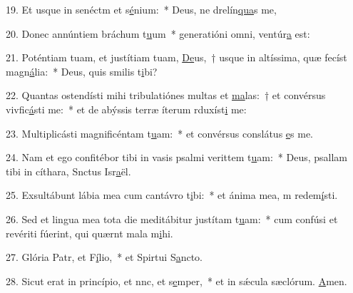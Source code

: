 19. Et usque in senéctm et s\uline{é}nium:~* Deus, ne drelín\uline{qua}s me,\par 
20. Donec annúntiem bráchum t\uline{u}um~* generatióni omni,  ventúr\uline{a} est:\par 
21. Poténtiam tuam, et justítiam tuam, \uline{De}us,~† usque in altíssima, quæ fecíst magn\uline{á}lia:~* Deus, quis smilis t\uline{i}bi?\par 
22. Quantas ostendísti mihi tribulatiónes multas et \uline{ma}las:~† et convérsus vivfic\uline{á}sti me:~* et de abýssis terræ íterum rduxíst\uline{i} me:\par 
23. Multiplicásti magnificéntam t\uline{u}am:~* et convérsus conslátus \uline{e}s me.\par 
24. Nam et ego confitébor tibi in vasis psalmi verittem t\uline{u}am:~* Deus, psallam tibi in cíthara, Snctus Isr\uline{a}ël.\par 
25. Exsultábunt lábia mea cum cantávro t\uline{i}bi:~* et ánima mea, m redem\uline{í}sti.\par 
26. Sed et lingua mea tota die meditábitur justítam t\uline{u}am:~* cum confúsi et revériti fúerint, qui quærnt mala m\uline{i}hi.\par 
27. Glória Patr, et F\uline{í}lio,~* et Spirtui S\uline{a}ncto.\par 
28. Sicut erat in princípio, et nnc, et s\uline{e}mper,~* et in sǽcula sæclórum. \uline{A}men.\par 
